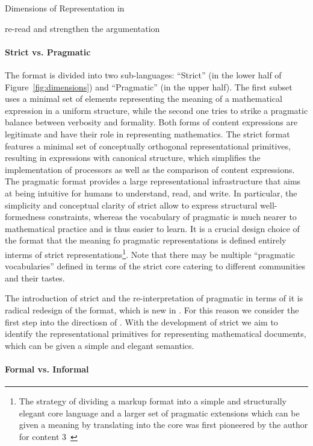 \begin{omgroup}[id=syntax-semantics]{Dimensions of Representation in \omdoc}
\begin{newpart}{re-read and strengthen the argumentation}
\paragraph{Strict vs. Pragmatic} The \omdoc format is divided into two sub-languages:
``Strict'' \omdoc (in the lower half of Figure~\ref{fig:dimensions}) and ``Pragmatic''
\omdoc (in the upper half). The first subset uses a minimal set of elements representing the meaning of a
mathematical expression in a uniform structure, while the second one tries to strike a
pragmatic balance between verbosity and formality. Both forms of content expressions are
legitimate and have their role in representing mathematics. The strict \omdoc format
features a minimal set of conceptually orthogonal representational primitives, resulting
in expressions with canonical structure, which simplifies the implementation of \omdoc
processors as well as the comparison of content expressions.  The pragmatic \omdoc
format provides a large representational infrastructure that aims at being intuitive for
humans to understand, read, and write. In particular, the simplicity and conceptual clarity of strict \omdoc allow to
express structural well-formedness constraints, whereas the vocabulary of pragmatic \omdoc
is much nearer to mathematical practice and is thus easier to learn. It is a crucial
design choice of the \omdoc format that the meaning fo pragmatic representations is
defined entirely interms of strict representations\footnote{The strategy of dividing a
  markup format into a simple and structurally elegant core language and a larger set of
  pragmatic extensions which can be given a meaning by translating into the core was first
  pioneered by the author for content {\mathml}3~\cite{CarlisleEd:MathML3}}. Note that
there may be multiple ``pragmatic vocabularies'' defined in terms of the strict core
catering to different communities and their tastes.

The introduction of strict \omdoc and the re-interpretation of pragmatic \omdoc in
terms of it is radical redesign of the \omdoc format, which is new in {}.
For this reason we consider {} the first step into the directiosn of
{}. With the development of strict \omdoc we aim to identify the
representational primitives for representing mathematical documents, which can be given a
simple and elegant semantics.

\paragraph{Formal vs. Informal} 


\end{newpart}
\end{omgroup}
